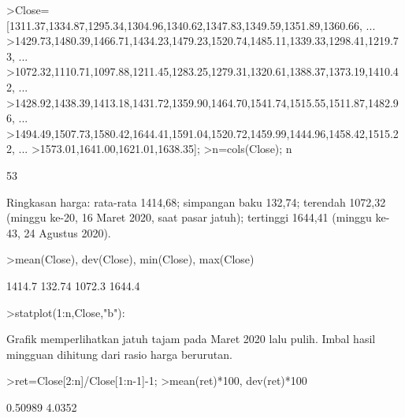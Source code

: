 \documentclass[a4paper,10pt]{article}
\begin{document}
\begin{eulernotebook}
\begin{eulercomment}
\begin{eulercomment}
\begin{eulercomment}
\begin{eulercomment}
\begin{eulercomment}
\begin{eulercomment}
\begin{eulercomment}
\begin{eulercomment}
\begin{eulercomment}
\begin{eulercomment}
\begin{eulercomment}
\begin{eulercomment}
\begin{eulercomment}
\begin{eulercomment}
\begin{eulercomment}
\begin{eulercomment}
\begin{eulercomment}
\begin{eulercomment}
\begin{eulercomment}
\begin{eulercomment}
\begin{eulercomment}
\begin{eulercomment}
\begin{eulercomment}
\begin{eulercomment}
\begin{eulercomment}
\begin{eulercomment}
\begin{eulercomment}
\begin{eulercomment}
\begin{eulercomment}
\end{eulercomment}
\begin{eulerprompt}
>Close=[1311.37,1334.87,1295.34,1304.96,1340.62,1347.83,1349.59,1351.89,1360.66, ...
>1429.73,1480.39,1466.71,1434.23,1479.23,1520.74,1485.11,1339.33,1298.41,1219.73, ...
>1072.32,1110.71,1097.88,1211.45,1283.25,1279.31,1320.61,1388.37,1373.19,1410.42, ...
>1428.92,1438.39,1413.18,1431.72,1359.90,1464.70,1541.74,1515.55,1511.87,1482.96, ...
>1494.49,1507.73,1580.42,1644.41,1591.04,1520.72,1459.99,1444.96,1458.42,1515.22, ...
>1573.01,1641.00,1621.01,1638.35];
>n=cols(Close); n
\end{eulerprompt}
\begin{euleroutput}
  53
\end{euleroutput}
\begin{eulercomment}
Ringkasan harga: rata-rata 1414,68; simpangan baku 132,74; terendah 1072,32 (minggu ke-20,
16 Maret 2020, saat pasar jatuh); tertinggi 1644,41 (minggu ke-43, 24 Agustus 2020).
\end{eulercomment}
\begin{eulerprompt}
>mean(Close), dev(Close), min(Close), max(Close)
\end{eulerprompt}
\begin{euleroutput}
  1414.7
  132.74
  1072.3
  1644.4
\end{euleroutput}
\begin{eulerprompt}
>statplot(1:n,Close,"b"):
\end{eulerprompt}
\begin{eulercomment}
Grafik memperlihatkan jatuh tajam pada Maret 2020 lalu pulih. Imbal hasil mingguan dihitung
dari rasio harga berurutan.
\end{eulercomment}
\begin{eulerprompt}
>ret=Close[2:n]/Close[1:n-1]-1;
>mean(ret)*100, dev(ret)*100
\end{eulerprompt}
\begin{euleroutput}
  0.50989
  4.0352
\end{euleroutput}
\begin{eulercomment}

\end{eulercomment}
\end{eulercomment}
\end{eulercomment}
\end{eulercomment}
\end{eulercomment}
\end{eulercomment}
\end{eulercomment}
\end{eulercomment}
\end{eulercomment}
\end{eulercomment}
\end{eulercomment}
\end{eulercomment}
\end{eulercomment}
\end{eulercomment}
\end{eulercomment}
\end{eulercomment}
\end{eulercomment}
\end{eulercomment}
\end{eulercomment}
\end{eulercomment}
\end{eulercomment}
\end{eulercomment}
\end{eulercomment}
\end{eulercomment}
\end{eulercomment}
\end{eulercomment}
\end{eulercomment}
\end{eulercomment}
\end{eulercomment}
\end{eulernotebook}
\end{document}
